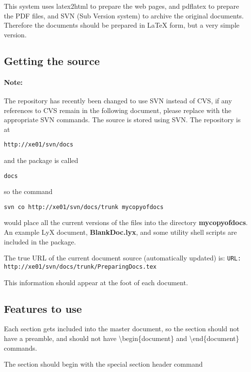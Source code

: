 
This system uses latex2html to prepare the web pages, and pdflatex
to prepare the PDF files, and SVN (Sub Version system) to archive
the original documents. Therefore the documents should be prepared
in \LaTeX{} form, but a very simple version. 


\subsection{Getting the source}
\paragraph{Note:} The repository has recently been changed to use SVN instead of CVS, if any 
references to CVS remain in the following document, please replace with the appropriate SVN commands.
The source is stored using SVN. The repository is at 

\begin{verbatim}
http://xe01/svn/docs
\end{verbatim}
and the package is called 

\begin{verbatim}
docs
\end{verbatim}
so the command

\begin{verbatim}
svn co http://xe01/svn/docs/trunk mycopyofdocs

\end{verbatim}
would place all the current versions of the files into the directory
\textbf{mycopyofdocs}.  An example LyX document, \textbf{BlankDoc.lyx},
and some utility shell scripts are included in the package.

The true URL of the current document source  (automatically updated) is:
\verb$URL: http://xe01/svn/docs/trunk/PreparingDocs.tex $

This information should appear at the foot of each document.

\subsection{Features to use}

Each section gets included into the master document, so the section
should not have a preamble, and should not have \textbackslash{}begin\{document\}
and \textbackslash{}end\{document\} commands.

The section should begin with the special section header command


